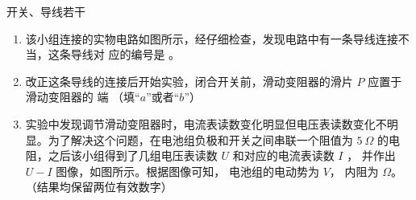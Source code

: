 \begin{enumerate}
\begin{enumerate}
开关、导线若干

\begin{enumerate}
	\item
该小组连接的实物电路如图所示，经仔细检查，发现电路中有一条导线连接不当，这条导线对
应的编号是 \underlinegap 。
\begin{figure}[h!]
\centering

\end{figure}


\item 
改正这条导线的连接后开始实验，闭合开关前，滑动变阻器的滑片 $ P $ 应置于滑动变阻器的
端 \underlinegap （填“$ a $”或者“$ b $”）

\item 
实验中发现调节滑动变阻器时，电流表读数变化明显但电压表读数变化不明显。为了解决这个问题，在电池组负极和开关之间串联一个阻值为 $ 5 \ \Omega $ 的电阻，之后该小组得到了几组电压表读数 $ U $
和对应的电流表读数 $ I $ ，
并作出 $ U-I $ 图像，如图所示。根据图像可知，
电池组的电动势为 \underlinegap $ V $，
内阻为 \underlinegap $ \Omega $。（结果均保留两位有效数字）
\begin{figure}[h!]
\centering

\end{figure}

\end{enumerate}





\end{enumerate}






\end{enumerate}
